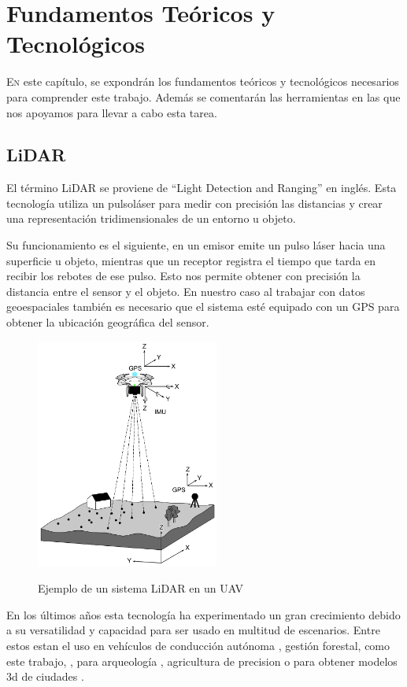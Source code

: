 \chapter{Fundamentos Teóricos y Tecnológicos}
\label{chap:fundamentos}

\lettrine{E}{n} este capítulo, se expondrán los fundamentos teóricos y tecnológicos necesarios para comprender este trabajo. Además se comentarán las herramientas en las que nos apoyamos para llevar a cabo esta tarea.

\section{LiDAR}

El término LiDAR se proviene de “Light Detection and Ranging” en inglés. Esta tecnología utiliza un pulsoláser para medir con precisión las distancias y crear una representación tridimensionales de un entorno u objeto.

Su funcionamiento es el siguiente, en un emisor emite un pulso láser hacia una superficie u objeto, mientras que un receptor registra el tiempo que tarda en recibir los rebotes de ese pulso. Esto nos permite obtener con precisión la distancia entre el sensor y el objeto. En nuestro caso al trabajar con datos geoespaciales también es necesario que el sistema esté equipado con un GPS para obtener la ubicación geográfica del sensor.


\begin{figure}[h]
\centering
\includegraphics[width=6cm]{imaxes/remotesensing-10-01094-g001.png}
\label{fig:uavsensor}
\caption{Ejemplo de un sistema LiDAR en un UAV \cite{rs10071094}}
\end{figure}


En los últimos años esta tecnología ha experimentado un gran crecimiento debido a su versatilidad y capacidad para ser usado en multitud de escenarios. Entre estos estan el uso en vehículos de conducción autónoma \cite{articleauto}, gestión forestal, como este trabajo, \cite{rs14010170}, para arqueología \cite{lidararque}, agricultura de precision \cite{RIVERA2023107737} o para obtener modelos 3d de ciudades \cite{lidarcity}.

